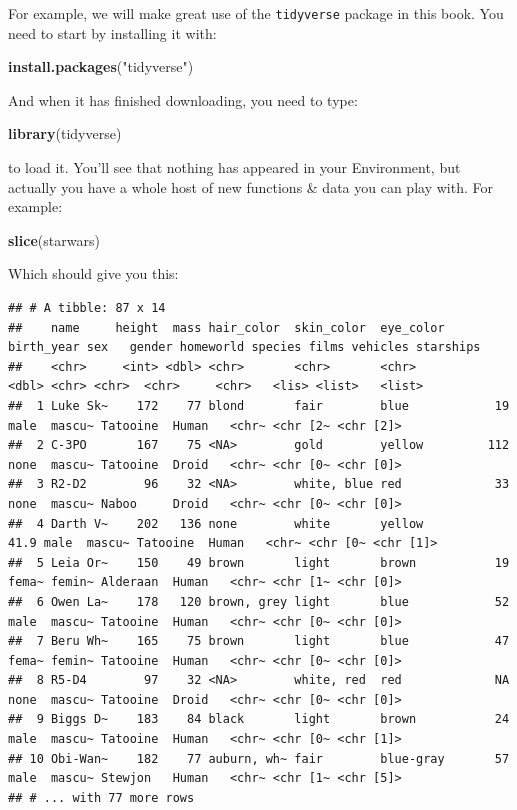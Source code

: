 \documentclass[
]{book}
\newenvironment{Shaded}{\begin{snugshade}}{\end{snugshade}}
\newcommand{\KeywordTok}[1]{\textcolor[rgb]{0.13,0.29,0.53}{\textbf{#1}}}
\newcommand{\NormalTok}[1]{#1}
\newcommand{\StringTok}[1]{\textcolor[rgb]{0.31,0.60,0.02}{#1}}
\begin{document}
For example, we will make great use of the \texttt{tidyverse} package in this book. You need to start by installing it with:

\begin{Shaded}
\begin{Highlighting}[]
\KeywordTok{install.packages}\NormalTok{(}\StringTok{"tidyverse"}\NormalTok{)}
\end{Highlighting}
\end{Shaded}

And when it has finished downloading, you need to type:

\begin{Shaded}
\begin{Highlighting}[]
\KeywordTok{library}\NormalTok{(tidyverse)}
\end{Highlighting}
\end{Shaded}

to load it. You'll see that nothing has appeared in your Environment, but actually you have a whole host of new functions \& data you can play with. For example:

\begin{Shaded}
\begin{Highlighting}[]
\KeywordTok{slice}\NormalTok{(starwars)}
\end{Highlighting}
\end{Shaded}

Which should give you this:

\begin{verbatim}
## # A tibble: 87 x 14
##    name     height  mass hair_color  skin_color  eye_color birth_year sex   gender homeworld species films vehicles starships
##    <chr>     <int> <dbl> <chr>       <chr>       <chr>          <dbl> <chr> <chr>  <chr>     <chr>   <lis> <list>   <list>   
##  1 Luke Sk~    172    77 blond       fair        blue            19   male  mascu~ Tatooine  Human   <chr~ <chr [2~ <chr [2]>
##  2 C-3PO       167    75 <NA>        gold        yellow         112   none  mascu~ Tatooine  Droid   <chr~ <chr [0~ <chr [0]>
##  3 R2-D2        96    32 <NA>        white, blue red             33   none  mascu~ Naboo     Droid   <chr~ <chr [0~ <chr [0]>
##  4 Darth V~    202   136 none        white       yellow          41.9 male  mascu~ Tatooine  Human   <chr~ <chr [0~ <chr [1]>
##  5 Leia Or~    150    49 brown       light       brown           19   fema~ femin~ Alderaan  Human   <chr~ <chr [1~ <chr [0]>
##  6 Owen La~    178   120 brown, grey light       blue            52   male  mascu~ Tatooine  Human   <chr~ <chr [0~ <chr [0]>
##  7 Beru Wh~    165    75 brown       light       blue            47   fema~ femin~ Tatooine  Human   <chr~ <chr [0~ <chr [0]>
##  8 R5-D4        97    32 <NA>        white, red  red             NA   none  mascu~ Tatooine  Droid   <chr~ <chr [0~ <chr [0]>
##  9 Biggs D~    183    84 black       light       brown           24   male  mascu~ Tatooine  Human   <chr~ <chr [0~ <chr [1]>
## 10 Obi-Wan~    182    77 auburn, wh~ fair        blue-gray       57   male  mascu~ Stewjon   Human   <chr~ <chr [1~ <chr [5]>
## # ... with 77 more rows
\end{verbatim}
\end{document}
